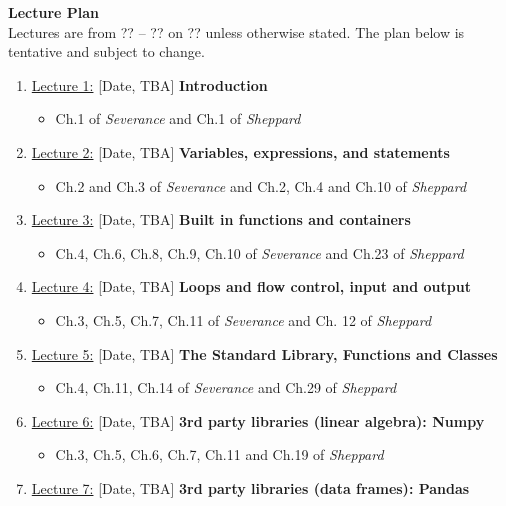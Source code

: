 \documentclass[12pt, a4paper]{article}
\begin{document}
\newpage
\noindent\textbf{\large Lecture Plan}\\
Lectures are from ?? -- ?? on ?? unless otherwise stated.
The plan below is tentative and subject to change.
\begin{enumerate}
    \item[] \underline{Lecture 1:} [Date, TBA] {\bf Introduction}
        \begin{itemize}
            \item Ch.1 of {\it Severance} and Ch.1 of {\it Sheppard}
        \end{itemize}
    \item[] \underline{Lecture 2:} [Date, TBA] {\bf Variables, expressions, and statements}
        \begin{itemize}
            \item Ch.2 and Ch.3 of {\it Severance} and Ch.2, Ch.4 and Ch.10 of {\it Sheppard}
        \end{itemize}
    \item[] \underline{Lecture 3:} [Date, TBA] {\bf Built in functions and containers}
        \begin{itemize}
            \item Ch.4, Ch.6, Ch.8, Ch.9, Ch.10 of {\it Severance} and Ch.23 of {\it Sheppard}
        \end{itemize}
    \item[] \underline{Lecture 4:} [Date, TBA] {\bf Loops and flow control, input and output}
        \begin{itemize}
            \item Ch.3, Ch.5, Ch.7, Ch.11 of {\it Severance} and Ch. 12 of {\it Sheppard}
        \end{itemize}
    \item[] \underline{Lecture 5:} [Date, TBA] {\bf The Standard Library, Functions and Classes}
        \begin{itemize}
            \item Ch.4, Ch.11, Ch.14 of {\it Severance} and Ch.29 of {\it Sheppard}
        \end{itemize}
    \item[] \underline{Lecture 6:} [Date, TBA] {\bf 3rd party libraries (linear algebra): Numpy}
        \begin{itemize}
            \item Ch.3, Ch.5, Ch.6, Ch.7, Ch.11 and Ch.19 of {\it Sheppard}
        \end{itemize}
    \item[] \underline{Lecture 7:} [Date, TBA] {\bf 3rd party libraries (data frames): Pandas}

\end{enumerate}
\end{document}
